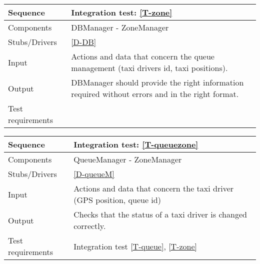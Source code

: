 \begin{table}[H]
    \begin{tabularx}{\textwidth}{l|X}
        \hline
        Sequence
        & 
        Integration test: \ref{T-zone}
        \\ \hline
        Components 
        & 
        DBManager - ZoneManager
        \\ \hline
        Stubs/Drivers 
        & 
        \ref{D-DB}
        \\ \hline
        Input 
        & 
        Actions and data that concern the queue management (taxi drivers id, taxi positions).
        \\ \hline
        Output 
        & 
        DBManager should provide the right information required without errors and in the right format.
        \\ \hline
        Test requirements 
        & 
        
        \\ \hline
    \end{tabularx}
\end{table}

\begin{table}[H]
    \begin{tabularx}{\textwidth}{l|X}
        \hline
        Sequence
        & 
        Integration test: \ref{T-queuezone}
        \\ \hline
        Components 
        & 
        QueueManager - ZoneManager
        \\ \hline
        Stubs/Drivers 
        & 
        \ref{D-queueM}
        \\ \hline
        Input 
        & 
        Actions and data that concern the taxi driver (GPS position, queue id)
        \\ \hline
        Output 
        & 
        Checks that the status of a taxi driver is changed correctly.
        \\ \hline
        Test requirements 
        & 
        Integration test \ref{T-queue}, \ref{T-zone}
        \\ \hline
    \end{tabularx}
\end{table}

